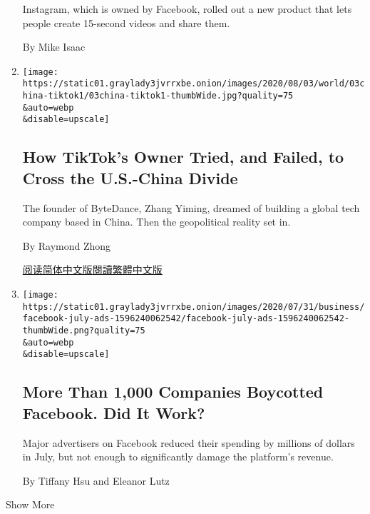 \begin{enumerate}
  Instagram, which is owned by Facebook, rolled out a new product that
  lets people create 15-second videos and share them.

  By Mike Isaac
\item
  \href{/2020/08/03/technology/tiktok-bytedance-us-china.html}{}

  \texttt{[image: https://static01.graylady3jvrrxbe.onion/images/2020/08/03/world/03china-tiktok1/03china-tiktok1-thumbWide.jpg?quality=75\\\&auto=webp\\\&disable=upscale]}

  \hypertarget{how-tiktoks-owner-tried-and-failed-to-cross-the-us-china-divide}{%
  \subsection{How TikTok's Owner Tried, and Failed, to Cross the
  U.S.-China
  Divide}\label{how-tiktoks-owner-tried-and-failed-to-cross-the-us-china-divide}}

  The founder of ByteDance, Zhang Yiming, dreamed of building a global
  tech company based in China. Then the geopolitical reality set in.

  By Raymond Zhong

  \href{https://cn.nytimes3xbfgragh.onion/technology/20200804/tiktok-trump-sale-microsoft/}{阅读简体中文版}\href{https://cn.nytimes3xbfgragh.onion/technology/20200804/tiktok-trump-sale-microsoft/zh-hant/}{閱讀繁體中文版}
\item
  \href{/2020/08/01/business/media/facebook-boycott.html}{}

  \texttt{[image: https://static01.graylady3jvrrxbe.onion/images/2020/07/31/business/facebook-july-ads-1596240062542/facebook-july-ads-1596240062542-thumbWide.png?quality=75\\\&auto=webp\\\&disable=upscale]}

  \hypertarget{more-than-1000-companies-boycotted-facebook-did-it-work}{%
  \subsection{More Than 1,000 Companies Boycotted Facebook. Did It
  Work?}\label{more-than-1000-companies-boycotted-facebook-did-it-work}}

  Major advertisers on Facebook reduced their spending by millions of
  dollars in July, but not enough to significantly damage the platform's
  revenue.

  By Tiffany Hsu and Eleanor Lutz
\end{enumerate}

Show More

